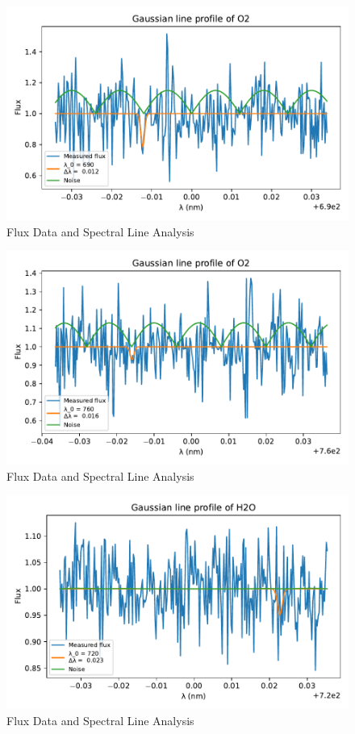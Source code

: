 \documentclass[reprint,english,notitlepage]{revtex4-2}
\begin{document}
\begin{figure}[h!]  
    \centering
    \includegraphics[scale =.5]{Figures/O2 690.pdf}
    \caption{Flux Data and Spectral Line Analysis}
    \label{fig: O2 690}
\end{figure}

\begin{figure}[h!]
  \centering
  \includegraphics[scale =.5]{Figures/O2 760.pdf}
  \caption{Flux Data and Spectral Line Analysis}
  \label{fig: O2 760}
\end{figure}

\begin{figure}[h!]
  \centering
  \includegraphics[scale =.5]{Figures/H2O 720.pdf}
  \caption{Flux Data and Spectral Line Analysis}
  \label{fig: H2 720}
\end{figure}
\end{document}
